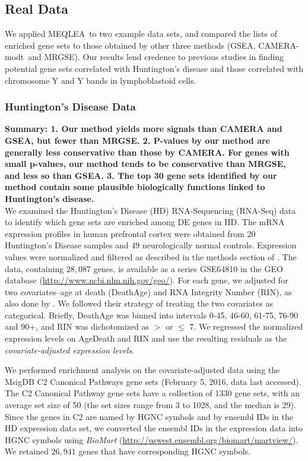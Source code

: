 \documentclass[a4,center,fleqn]{NAR}
\newcommand{\OurMethod}{MEQLEA}
\newcommand{\CMT}{CAMERA-modt}
\newcommand{\genr}{MRGSE}
\begin{document}
	\subsection{Real Data}\label{section:realdata}
	We applied \OurMethod~to two example data sets, and compared the lists of enriched gene sets to those
	obtained by other three methods (GSEA, \CMT~and \genr). %
	Our results lend credence to previous studies in finding potential gene sets correlated with
	Huntington's disease and those correlated with chromosome Y and Y bands in lymphoblastoid cells.  
	
	\subsubsection{Huntington's Disease Data}
	\textbf{Summary: 1. Our method yields more signals than CAMERA and GSEA, but fewer than MRGSE. 2. P-values by our method are generally less conservative than those by CAMERA. For genes with small p-values, our method tends to be conservative than MRGSE, and less so than GSEA. 3. The top 30 gene sets identified by our method contain some plausible biologically functions linked to Huntington's disease.}\\
	
	We examined the Huntington's Disease (HD) RNA-Sequencing (RNA-Seq) data \citep{labadorf2015rna}  to
	identify which gene sets are enriched among DE genes in HD. The mRNA expression profiles in human
	prefrontal cortex were obtained from 20 Huntington's Disease samples and 49 neurologically normal
	controls.  Expression values were normalized and filtered as described in the methods section of
	\cite{labadorf2015rna}.	The data, containing $28,087$ genes, is available as a series GSE64810 in the GEO database (\url{http://www.ncbi.nlm.nih.gov/geo/}). 
	For each gene, we adjusted for two covariates--age at death (DeathAge) and RNA Integrity Number (RIN), as also done by \citet{labadorf2015rna}. We followed their strategy of treating the two
	covariates as categorical. Briefly, DeathAge was binned into intervals 0-45, 46-60, 61-75, 76-90 and
	90+,  and RIN was dichotomized as  $>$ or $\leq$ 7. We regressed the normalized expression levels on 
	AgeDeath and RIN and use the resulting residuals as the \textit{covariate-adjusted expression levels}.
	
	We performed enrichment analysis on the covariate-adjusted data using the MsigDB
	\citep{subramanian2005gene} C2 Canonical Pathways gene sets (February 5, 2016, data last accessed).
	The C2 Canonical Pathway gene sets have a collection of 1330 gene sets, with an average set size of
	50 (the set sizes range from 3 to 1028, and the median is 29). Since the genes in C2 are named by
	HGNC symbols and by ensembl IDs in the HD expression data set, we converted the ensembl IDs in the
	expression data into HGNC symbols using \textit{BioMart}
	(\url{http://uswest.ensembl.org/biomart/martview/}). We retained $26,941$ genes that have
	corresponding HGNC symbols. 
	
\end{document}
